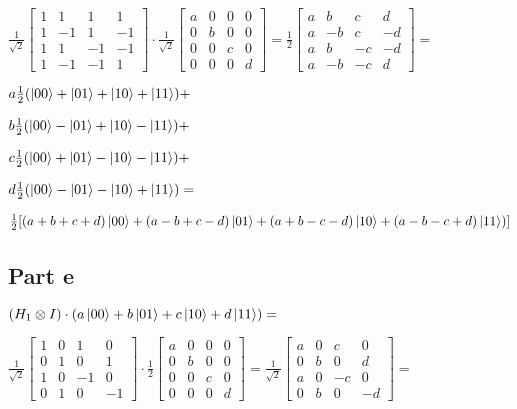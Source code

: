 \documentclass{article}
\begin{document}
\medskip
$
\frac1{\sqrt2}
\begin{bmatrix}
1 & 1 & 1 & 1\\
1 & -1 & 1 & -1\\
1 & 1 & -1 & -1\\
1 & -1 & -1 & 1
\end{bmatrix}
\cdot
\frac1{\sqrt2}
\begin{bmatrix}
a & 0 & 0 & 0\\
0 & b & 0 & 0\\
0 & 0 & c & 0\\
0 & 0 & 0 & d
\end{bmatrix}
=
\frac12
\begin{bmatrix}
a & b & c & d\\
a & -b & c & -d\\
a & b & -c & -d\\
a & -b & -c & d
\end{bmatrix} = $
\medskip

\smallskip
$a\frac12(\ket{00}+\ket{01}+\ket{10}+\ket{11}) + $

\smallskip
$b\frac12(\ket{00}- \ket{01}+\ket{10}- \ket{11}) + $

\smallskip
$c\frac12(\ket{00}+\ket{01}- \ket{10}- \ket{11}) + $

\smallskip
$d\frac12(\ket{00}- \ket{01}- \ket{10}+\ket{11}) = $

\smallskip
$\frac12[(a+b+c+d)\ket{00} + (a-b+c-d)\ket{01} + (a+b-c-d)\ket{10} + (a-b-c+d)\ket{11})]$


\subsection{Part e}

$(H_1\otimes I)\cdot(a\ket{00} + b\ket{01} + c\ket{10} + d\ket{11}) = $

\medskip
$
\frac1{\sqrt2}
\begin{bmatrix}
1 & 0 & 1 & 0\\
0 & 1 & 0 & 1\\
1 & 0 & -1 & 0\\
0 & 1 & 0 & -1
\end{bmatrix}
\cdot
\frac12
\begin{bmatrix}
a & 0 & 0 & 0\\
0 & b & 0 & 0\\
0 & 0 & c & 0\\
0 & 0 & 0 & d
\end{bmatrix}
=
\frac1{\sqrt2}
\begin{bmatrix}
a & 0 & c & 0\\
0 & b & 0 & d\\
a & 0 & -c & 0\\
0 & b & 0 & -d
\end{bmatrix} = $
\medskip
\end{document}

